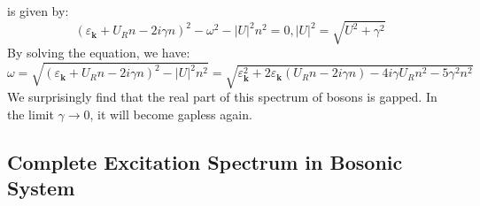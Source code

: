 \documentclass{article}
\newcommand{\tmmathbf}[1]{\ensuremath{\boldsymbol{#1}}}
\begin{document}
is given by:
\begin{equation}
  (\varepsilon_{\tmmathbf{k}} + U_R n - 2 i \gamma n)^2 - \omega^2 - | U |^2
  n^2 = 0, | U |^2 = \sqrt{U^2 + \gamma^2}
\end{equation}
By solving the equation, we have:
\begin{equation}
  \omega = \sqrt{(\varepsilon_{\tmmathbf{k}} + U_R n - 2 i \gamma n)^2 - | U
  |^2 n^2} = \sqrt{\varepsilon_{\tmmathbf{k}}^2 + 2 \varepsilon_{\tmmathbf{k}}
  (U_R n - 2 i \gamma n) - 4 i \gamma U_R n^2 - 5 \gamma^2 n^2} \label{ES}
\end{equation}
We surprisingly find that the real part of this spectrum of bosons is gapped.
In the limit $\gamma \rightarrow 0$, it will become gapless again.

\subsection{Complete Excitation Spectrum in Bosonic System}
\end{document}
